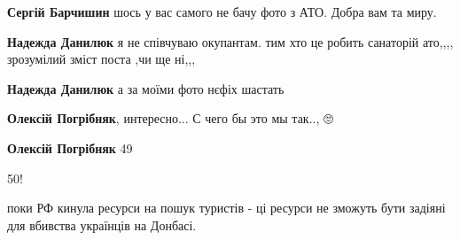 \begin{itemize}
\begin{itemize}
\textbf{Сергій Барчишин} шось у вас самого не бачу фото з АТО. Добра вам та миру.

 
\textbf{Надежда Данилюк} я не співчуваю окупантам. тим хто це робить санаторій ато,,,, зрозумілий зміст поста ,чи ще ні,,,

 
\textbf{Надежда Данилюк} а за моїми фото нєфіх шастать
\end{itemize}

 
\textbf{Олексій Погрібняк}, интересно... С чего бы это мы так.., 🙄🤔

 
\textbf{Олексій Погрібняк}
49🤣🤣🤣

 
50!

 

поки РФ кинула ресурси на пошук туристів - ці ресурси не зможуть бути задіяні
для вбивства українців на Донбасі.


\end{itemize}
